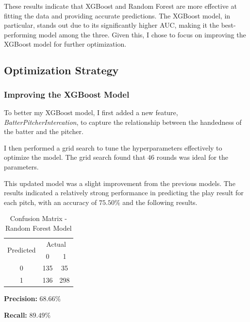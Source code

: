 \documentclass{article}
\begin{document}
These results indicate that XGBoost and Random Forest are more effective at fitting the data and providing accurate predictions. The XGBoost model, in particular, stands out due to its significantly higher AUC, making it the best-performing model among the three. Given this, I chose to focus on improving the XGBoost model for further optimization.

\subsection{Optimization Strategy}
\subsubsection{Improving the XGBoost Model}
To better my XGBoost model, I first added a new feature, \textit{BatterPitcherIntercation}, to capture the relationship between the handedness of the batter and the pitcher. 

I then performed a grid search to tune the hyperparameters effectively to optimize the model. The grid search found that $46$ rounds was ideal for the parameters. 

This updated model was a slight improvement from the previous models. The results indicated a relatively strong performance in predicting the play result for each pitch, with an accuracy of $75.50\%$ and the following results. 

\begin{table}[h!]
\centering
\begin{tabular}{|c|c|c|}
\hline
\multirow{2}{*}{Predicted} & \multicolumn{2}{c|}{Actual} \\ \cline{2-3} 
                           & 0   & 1   \\ \hline
0                          & 135  & 35  \\ \hline
1                          & 136 & 298 \\ \hline
\end{tabular}
\caption{Confusion Matrix - Random Forest Model}
\end{table}


\textbf{Precision: } $68.66\%$ 


\textbf{Recall: } $89.49\%$
\end{document}
